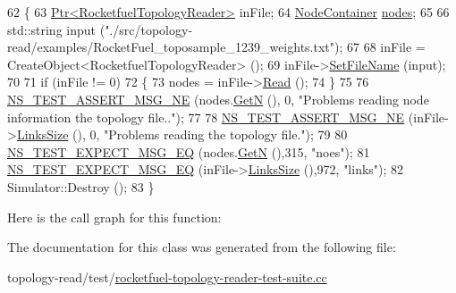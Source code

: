 \begin{DoxyCode}
62 \{
63   \hyperlink{classns3_1_1Ptr}{Ptr<RocketfuelTopologyReader>} inFile;
64   \hyperlink{classns3_1_1NodeContainer}{NodeContainer} \hyperlink{visualizer-ideas_8txt_a3e1b3808014a2c68ab0cd0182e041be2}{nodes};
65 
66   std::string input (\textcolor{stringliteral}{"./src/topology-read/examples/RocketFuel\_toposample\_1239\_weights.txt"});
67 
68   inFile = CreateObject<RocketfuelTopologyReader> ();
69   inFile->\hyperlink{classns3_1_1TopologyReader_a6364c548ea978c4eda042075c99ca730}{SetFileName} (input);
70 
71   \textcolor{keywordflow}{if} (inFile != 0)
72     \{
73       nodes = inFile->\hyperlink{classns3_1_1RocketfuelTopologyReader_aecde048f1ebfdce6e886cba1a798f0b1}{Read} ();
74     \}
75 
76   \hyperlink{group__testing_ga73d66fb0050a5111453fd144e767b91a}{NS\_TEST\_ASSERT\_MSG\_NE} (nodes.\hyperlink{classns3_1_1NodeContainer_aed647ac56d0407a7706aba02eb44b951}{GetN} (), 0, \textcolor{stringliteral}{"Problems reading node information the
       topology file.."});
77 
78   \hyperlink{group__testing_ga73d66fb0050a5111453fd144e767b91a}{NS\_TEST\_ASSERT\_MSG\_NE} (inFile->\hyperlink{classns3_1_1TopologyReader_ae610852021242bb82d7bae992a31ebb7}{LinksSize} (), 0, \textcolor{stringliteral}{"Problems reading the
       topology file."});
79 
80   \hyperlink{group__testing_ga7304ba46a28d8cf08dfdfd6499cf7068}{NS\_TEST\_EXPECT\_MSG\_EQ} (nodes.\hyperlink{classns3_1_1NodeContainer_aed647ac56d0407a7706aba02eb44b951}{GetN} (),315, \textcolor{stringliteral}{"noes"});
81   \hyperlink{group__testing_ga7304ba46a28d8cf08dfdfd6499cf7068}{NS\_TEST\_EXPECT\_MSG\_EQ} (inFile->\hyperlink{classns3_1_1TopologyReader_ae610852021242bb82d7bae992a31ebb7}{LinksSize} (),972, \textcolor{stringliteral}{"links"});
82   Simulator::Destroy ();
83 \}
\end{DoxyCode}


Here is the call graph for this function\+:




The documentation for this class was generated from the following file\+:\begin{DoxyCompactItemize}
\item 
topology-\/read/test/\hyperlink{rocketfuel-topology-reader-test-suite_8cc}{rocketfuel-\/topology-\/reader-\/test-\/suite.\+cc}\end{DoxyCompactItemize}
